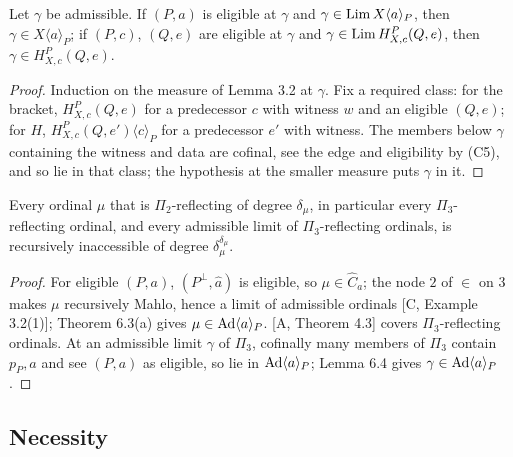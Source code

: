 \documentclass[11pt]{article}
\begin{document}
\begin{statement} Let $\gamma$ be admissible. If $(P,a)$ is eligible at $\gamma$ and
$\gamma \in \mathrm{Lim}\, X\langle a\rangle_P$, then $\gamma \in X\langle a\rangle_P$; if $(P,c)$, $(Q,e)$ are eligible at
$\gamma$ and $\gamma \in \mathrm{Lim}\, H^P_{X,c}(Q,e)$, then $\gamma \in H^P_{X,c}(Q,e)$.
\end{statement}

\begin{proof}
Induction on the measure of Lemma 3.2 at $\gamma$. Fix a required class: for the bracket, $H^P_{X,c}(Q,e)$ for a
predecessor $c$ with witness $w$ and an eligible $(Q,e)$; for $H$, $H^P_{X,c}(Q,e')\langle c\rangle_P$ for a predecessor
$e'$ with witness. The members below $\gamma$ containing the witness and data are cofinal, see the edge and eligibility
by (C5), and so lie in that class; the hypothesis at the smaller measure puts $\gamma$ in it.
\end{proof}

\begin{statement} Every ordinal $\mu$ that is $\Pi_2$-reflecting of degree $\delta_\mu$, in
particular every $\Pi_3$-reflecting ordinal, and every admissible limit of $\Pi_3$-reflecting ordinals, is recursively
inaccessible of degree $\delta_\mu^{\delta_\mu}$.
\end{statement}

\begin{proof}
For eligible $(P,a)$, $(P^\bot,\hat a)$ is eligible, so $\mu \in \widehat C_a$; the node $2$ of $\in$ on $3$ makes $\mu$
recursively Mahlo, hence a limit of admissible ordinals [C, Example 3.2(1)]; Theorem 6.3(a) gives $\mu \in \mathrm{Ad}\langle a\rangle_P$. [A, Theorem
4.3] covers $\Pi_3$-reflecting ordinals. At an admissible limit $\gamma$ of $\Pi_3$, cofinally many members of $\Pi_3$
contain $p_P, a$ and see $(P,a)$ as eligible, so lie in $\mathrm{Ad}\langle a\rangle_P$; Lemma 6.4 gives $\gamma \in \mathrm{Ad}\langle
a\rangle_P$.
\end{proof}

\subsection{Necessity}
\end{document}
